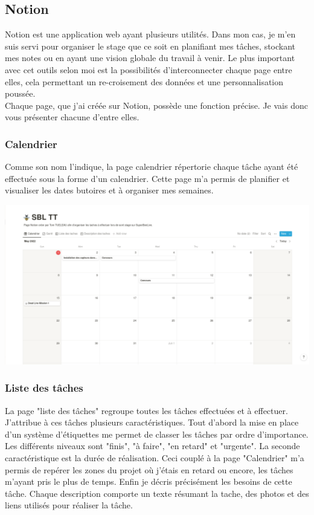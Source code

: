 \documentclass[12pt,french,a4paper]{article}
\begin{document}
\subsection{Notion}
Notion est une application web ayant plusieurs utilités. Dans mon cas, je m'en suis servi pour organiser le stage que ce soit en planifiant mes tâches, stockant mes notes ou en ayant une vision globale du travail à venir. Le plus important avec cet outils selon moi est la possibilités d'interconnecter chaque page entre elles, cela permettant un re-croisement des données et une personnalisation poussée.  
\\
Chaque page, que j'ai créée sur Notion, possède une fonction précise. Je vais donc vous présenter chacune d'entre elles.

\subsubsection{Calendrier}
Comme son nom l'indique, la page calendrier répertorie chaque tâche ayant été effectuée sous la forme d'un calendrier. Cette page m'a permis de planifier et visualiser les dates butoires et à organiser mes semaines.    
\begin{center}	
\includegraphics[scale=0.35]{../img/notioncalender.png}
\label{Calendrier}
\end{center}

\subsubsection{Liste des tâches}
La page "liste des tâches" regroupe toutes les tâches effectuées et à effectuer. J'attribue à ces tâches plusieurs caractéristiques. Tout d'abord la mise en place d'un système d'étiquettes me permet de classer les tâches par ordre d'importance. Les différents niveaux sont "finis", "à faire", "en retard" et "urgente". La seconde caractéristique est la durée de réalisation. Ceci  couplé à la page "Calendrier" m'a permis de repérer les zones du projet où j'étais en retard ou encore, les tâches m'ayant pris le plus de temps. Enfin je décris  précisément les besoins de cette tâche. Chaque description comporte un texte résumant la tache, des photos et des liens utilisés pour réaliser la tâche.
\end{document}
